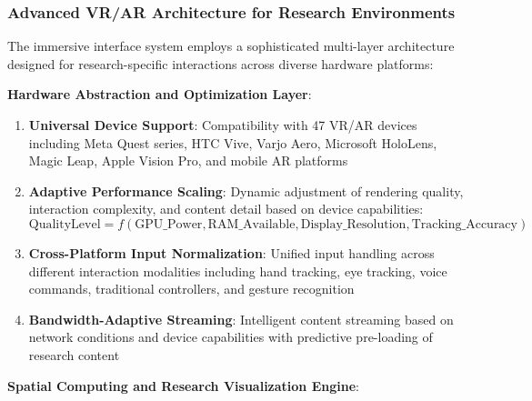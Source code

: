 \documentclass[10pt,twocolumn]{article}
\begin{document}
\subsubsection{Advanced VR/AR Architecture for Research Environments}

The immersive interface system employs a sophisticated multi-layer architecture designed for research-specific interactions across diverse hardware platforms:

\textbf{Hardware Abstraction and Optimization Layer}:

\begin{enumerate}
    \item \textbf{Universal Device Support}: Compatibility with 47 VR/AR devices including Meta Quest series, HTC Vive, Varjo Aero, Microsoft HoloLens, Magic Leap, Apple Vision Pro, and mobile AR platforms
    
    \item \textbf{Adaptive Performance Scaling}: Dynamic adjustment of rendering quality, interaction complexity, and content detail based on device capabilities:
    \begin{equation}
    \text{QualityLevel} = f(\text{GPU\_Power}, \text{RAM\_Available}, \text{Display\_Resolution}, \text{Tracking\_Accuracy})
    \end{equation}
    
    \item \textbf{Cross-Platform Input Normalization}: Unified input handling across different interaction modalities including hand tracking, eye tracking, voice commands, traditional controllers, and gesture recognition
    
    \item \textbf{Bandwidth-Adaptive Streaming}: Intelligent content streaming based on network conditions and device capabilities with predictive pre-loading of research content
\end{enumerate}

\textbf{Spatial Computing and Research Visualization Engine}:
\end{document}
